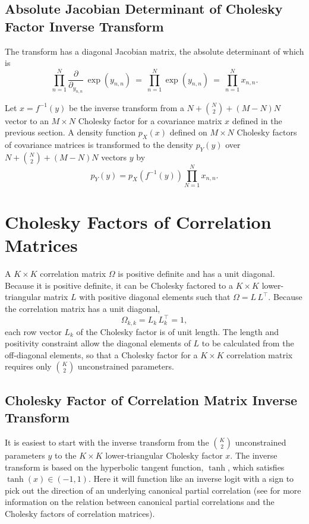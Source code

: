\subsection{Absolute Jacobian Determinant of Cholesky Factor Inverse Transform}

The transform has a diagonal Jacobian matrix, the absolute determinant
of which is
%
\[
\prod_{n=1}^N  \frac{\partial}{\partial_{y_{n,n}}} \, \exp(y_{n,n})
\ = \
\prod_{n=1}^N \exp(y_{n,n})
\ = \
\prod_{n=1}^N x_{n,n}.
\]

Let $x = f^{-1}(y)$ be the inverse transform from a $N + \binom{N}{2}
+ (M - N)N$ vector to an $M \times N$ Cholesky factor for a covariance
matrix $x$ defined in the previous section.  A density function
$p_X(x)$ defined on $M \times N$ Cholesky factors of covariance
matrices is transformed to the density $p_Y(y)$ over $N + \binom{N}{2}
+ (M - N)N$ vectors $y$ by
%
\[
p_Y(y) = p_X(f^{-1}(y)) \prod_{N=1}^N x_{n,n}.
\]

\section{Cholesky Factors of Correlation Matrices}

A $K \times K$ correlation matrix $\Omega$ is positive definite and
has a unit diagonal.  Because it is positive definite, it can be
Cholesky factored to a $K \times K$ lower-triangular matrix $L$ with
positive diagonal elements such that $\Omega = L\,L^{\top}$.  Because
the correlation matrix has a unit diagonal,
\[
\Omega_{k,k} = L_k\,L_k^{\top} = 1,
\]
each row vector $L_k$ of the Cholesky factor is of unit length.  The
length and positivity constraint allow the diagonal elements of $L$ to
be calculated from the off-diagonal elements, so that a Cholesky
factor for a $K \times K$ correlation matrix requires only
$\binom{K}{2}$ unconstrained parameters.

\subsection{Cholesky Factor of Correlation Matrix Inverse Transform}

It is easiest to start with the inverse transform from the
$\binom{K}{2}$ unconstrained parameters $y$ to the $K \times K$
lower-triangular Cholesky factor $x$.  The inverse transform is based
on the hyperbolic tangent function, $\tanh$, which satisfies $\tanh(x)
\in (-1,1)$.  Here it will function like an inverse logit with a sign
to pick out the direction of an underlying canonical partial
correlation (see \refsection{correlation-matrix-transform} for more
information on the relation between canonical partial correlations and
the Cholesky factors of correlation matrices).

